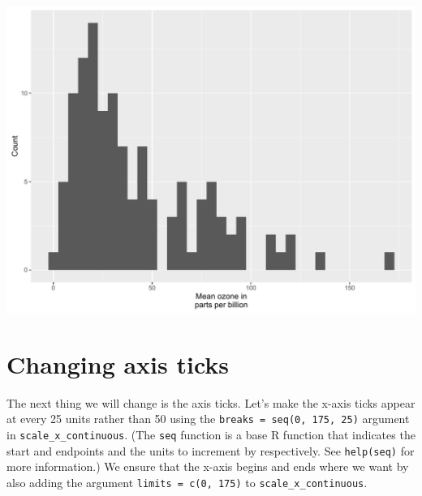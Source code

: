 \begin{center}\includegraphics[width=0.55\linewidth]{figures/histogram_6-1} \end{center}

\section{Changing axis ticks}\label{changing-axis-ticks}

The next thing we will change is the axis ticks. Let's make the x-axis
ticks appear at every 25 units rather than 50 using the
\texttt{breaks\ =\ seq(0,\ 175,\ 25)} argument in
\texttt{scale\_x\_continuous}. (The \texttt{seq} function is a base R
function that indicates the start and endpoints and the units to
increment by respectively. See \texttt{help(seq)} for more information.)
We ensure that the x-axis begins and ends where we want by also adding
the argument \texttt{limits\ =\ c(0,\ 175)} to
\texttt{scale\_x\_continuous}.

\begin{Shaded}
\begin{Highlighting}[]
\StringTok{ }\NormalTok{(} \StringTok{ }
\StringTok{      }\NormalTok{(}\NormalTok{(}  \NormalTok{) +}
\StringTok{      }\NormalTok{(} \NormalTok{,}
\StringTok{        } \NormalTok{(}\NormalTok{, }\NormalTok{, }\NormalTok{),}
\StringTok{        }\NormalTok{(}\NormalTok{, }\NormalTok{)) +}
\StringTok{      }\NormalTok{(} \NormalTok{)}
\end{Highlighting}
\end{Shaded}

